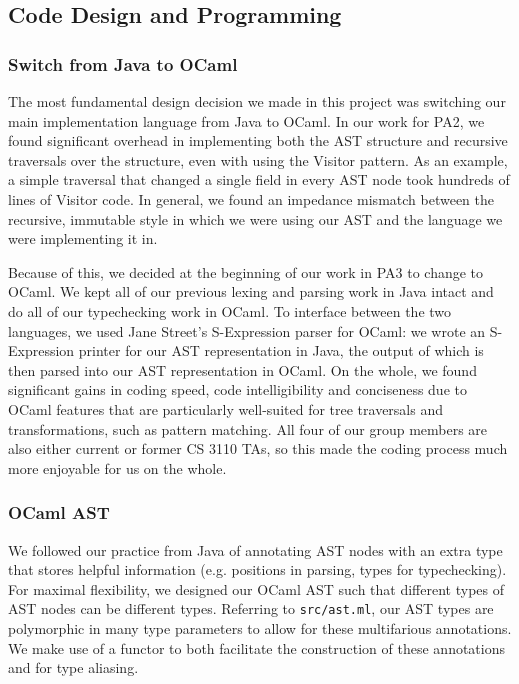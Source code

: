 \documentclass{hw}
\begin{document}
\subsection{Code Design and Programming}
\subsubsection{Switch from Java to OCaml}
The most fundamental design decision we made in this project was switching our
main implementation language from Java to OCaml. In our work for PA2,
we found significant overhead in implementing both the AST structure and recursive
traversals over the structure, even with using the Visitor pattern. As an example,
a simple traversal that changed a single field in every AST node took hundreds of lines
of Visitor code. In general, we found an impedance mismatch between the recursive,
immutable style in which we were using our AST and the language we were implementing
it in.

Because of this, we decided at the beginning of our work in PA3 to change to OCaml.
We kept all of our previous lexing and parsing work in Java intact and do all of our
typechecking work in OCaml. To interface between the two languages, we used Jane Street's
S-Expression parser for OCaml: we wrote an S-Expression printer for our AST representation
in Java, the output of which is then parsed into our AST representation in OCaml. On the
whole, we found significant gains in coding speed, code intelligibility and conciseness
due to OCaml features that are particularly well-suited for tree traversals and transformations, such as pattern matching. All four of our group members are also either current or former
CS 3110 TAs, so this made the coding process much more enjoyable for us on the whole.

\subsubsection{OCaml AST}
We followed our practice from Java of annotating AST nodes with an extra type that
stores helpful information (e.g. positions in parsing, types for typechecking). For
maximal flexibility, we designed our OCaml AST such that different types of AST nodes
can be different types. Referring to \texttt{src/ast.ml}, our AST types are polymorphic
in many type parameters to allow for these multifarious annotations. We make use of a
functor to both facilitate the construction of these annotations and for type aliasing.
\end{document}
